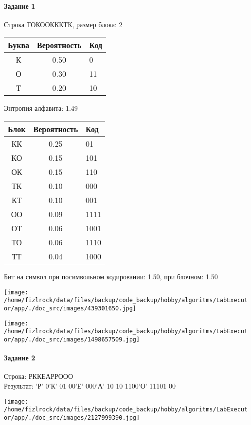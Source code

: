 \documentclass[a4paper, 12pt]{article}
\begin{document}
\paragraph{Задание 1}

Строка ТОКООКККТК, размер блока: 2
\begin{center}
 \begin{tabular}{ |c|c|l| } 
  \hline
     Буква & Вероятность & Код\\ \hline
К & 0.50 & 0\\\hline
О & 0.30 & 11\\\hline
Т & 0.20 & 10
\\ \hline \end{tabular}
\end{center}
Энтропия алфавита: 1.49
\begin{center}
 \begin{tabular}{ |c|c|l| } 
  \hline
     Блок & Вероятность & Код\\ \hline
КК & 0.25 & 01\\\hline
КО & 0.15 & 101\\\hline
ОК & 0.15 & 110\\\hline
ТК & 0.10 & 000\\\hline
КТ & 0.10 & 001\\\hline
ОО & 0.09 & 1111\\\hline
ОТ & 0.06 & 1001\\\hline
ТО & 0.06 & 1110\\\hline
ТТ & 0.04 & 1000
\\ \hline \end{tabular}
\end{center}
Бит на символ при посимвольном кодировании: 1.50, при блочном: 1.50

\texttt{[image: /home/fizlrock/data/files/backup/code\_backup/hobby/algoritms/LabExecutor/app/./doc\_src/images/439301650.jpg]}

\texttt{[image: /home/fizlrock/data/files/backup/code\_backup/hobby/algoritms/LabExecutor/app/./doc\_src/images/1498657509.jpg]}
\pagebreak
\paragraph{Задание 2}

Строка: 
РККЕАРРООО\\
Результат: 'Р' 0'К' 01 00'Е' 000'А' 10 10 1100'О' 11101 00

\texttt{[image: /home/fizlrock/data/files/backup/code\_backup/hobby/algoritms/LabExecutor/app/./doc\_src/images/2127999390.jpg]}
\end{document}
